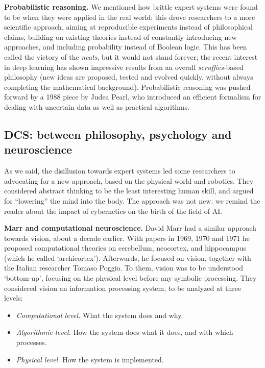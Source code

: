 \documentclass[../main.tex]{subfiles}
\begin{document}
\vspace{4pt}
\textbf{Probabilistic reasoning.}
We mentioned how brittle expert systems were found to be when they were applied in the real world: this drove researchers to a more scientific approach, aiming at reproducible experiments instead of philosophical claims, building on existing theories instead of constantly introducing new approaches, and including probability instead of Boolean logic. This has been called the victory of the \textit{neats}, but it would not stand forever; the recent interest in deep learning has shown impressive results from an overall \textit{scruffies}-based philosophy (new ideas are proposed, tested and evolved quickly, without always completing the mathematical background). Probabilistic reasoning was pushed forward by a 1988 piece by Judea Pearl\cite{pearlProbabilisticReasoningIntelligent1988}, who introduced an efficient formalism for dealing with uncertain data as well as practical algorithms.

\subsection{DCS: between philosophy, psychology and neuroscience}
As we said, the disillusion towards expert systems led some researchers to advocating for a new approach, based on the physical world and robotics. They considered abstract thinking to be the least interesting human skill, and argued for ``lowering'' the mind into the body. The approach was not new: we remind the reader about the impact of cybernetics on the birth of the field of AI.

\vspace{4pt}
\textbf{Marr and computational neuroscience.}
David Marr had a similar approach towards vision, about a decade earlier. With papers in 1969, 1970 and 1971 he proposed computational theories on cerebellum\cite{marrTheoryCerebellarCortex1969}, neocortex\cite{marrTheoryCerebralNeocortex1970}, and hippocampus (which he called `archicortex')\cite{marrSimpleMemoryTheory1971}. Afterwards, he focused on vision, together with the Italian researcher Tomaso Poggio. To them, vision was to be understood `bottom-up', focusing on the physical level before any symbolic processing. They considered vision an information processing system, to be analyzed at three levels\cite{marrUnderstandingComputationUnderstanding1976}:

\begin{itemize}
    \item \textit{Computational level.} What the system does and why.
    \item \textit{Algorithmic level.} How the system does what it does, and with which processes.
    \item \textit{Physical level.} How the system is implemented.
\end{itemize}
\end{document}
